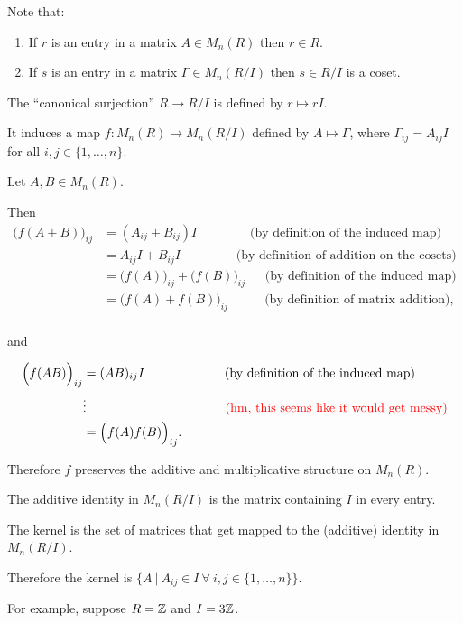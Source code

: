 \documentclass[12pt]{article}
\begin{document}
Note that:
\begin{enumerate}
\item If $r$ is an entry in a matrix $A \in M_n(R)$ then $r \in R$.
\item If $s$ is an entry in a matrix $\Gamma \in M_n(R/I)$ then $s \in R/I$ is a coset.
\end{enumerate}

The ``canonical surjection'' $R \to R/I$ is defined by $r \mapsto rI$.

It induces a map $f:M_n(R) \to M_n(R/I)$ defined by $A \mapsto \Gamma$, where
$\Gamma_{ij} = A_{ij}I$ for all $i,j \in \{1, \ldots, n\}$.

Let $A, B \in M_n(R)$.

Then
\begin{align*}
  \Big(f(A + B)\Big)_{ij}
  &= (A_{ij} + B_{ij})I ~~~~~~~~~~~~~~~~~~~\text{(by definition of the induced map)}\\
  &= A_{ij}I + B_{ij}I ~~~~~~~~~~~~~~~~~~~~\text{(by definition of addition on the cosets)}\\
  &= \Big(f(A)\Big)_{ij} + \Big(f(B)\Big)_{ij} ~~~~~~~\text{(by definition of the induced map)}\\
  &= \Big(f(A) + f(B)\Big)_{ij}~~~~~~~~~~~~~\text{(by definition of matrix addition)},\\
\end{align*}

and

\begin{align*}
  \Big(f(AB)\Big)_{ij}
  &= (AB)_{ij}I ~~~~~~~~~~~~~~~~~~~\text{(by definition of the induced map)}\\
  &\vdots   ~~~~~~~~~~~~~~~~~~~~~~~~~~~~~~~~~\text{\textcolor{red}{(hm, this seems like it would get messy)}}\\
  &= \Big(f(A)f(B)\Big)_{ij}.
\end{align*}

Therefore $f$ preserves the additive and multiplicative structure on $M_n(R)$.


The additive identity in $M_n(R/I)$ is the matrix containing $I$ in every entry.

The kernel is the set of matrices that get mapped to the (additive) identity in $M_n(R/I)$.

Therefore the kernel is $\{A ~|~ A_{ij} \in I ~\forall~ i, j \in \{1, \ldots, n\}\}$.

For example, suppose $R = \mathbb{Z}$ and $I = 3\mathbb{Z}$.
\end{document}
